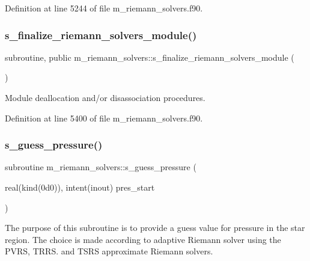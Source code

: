 Definition at line 5244 of file m\+\_\+riemann\+\_\+solvers.\+f90.

\mbox{\label{namespacem__riemann__solvers_a5bd1ce6fbbb840b5b1c6dd97ccb8d674}} 
\subsubsection{\texorpdfstring{s\+\_\+finalize\+\_\+riemann\+\_\+solvers\+\_\+module()}{s\_finalize\_riemann\_solvers\_module()}}
{\footnotesize\ttfamily subroutine, public m\+\_\+riemann\+\_\+solvers\+::s\+\_\+finalize\+\_\+riemann\+\_\+solvers\+\_\+module (\begin{DoxyParamCaption}{ }\end{DoxyParamCaption})}



Module deallocation and/or disassociation procedures. 



Definition at line 5400 of file m\+\_\+riemann\+\_\+solvers.\+f90.

\mbox{\label{namespacem__riemann__solvers_a7e533d9eadb12af316d72f1b722735d8}} 
\subsubsection{\texorpdfstring{s\+\_\+guess\+\_\+pressure()}{s\_guess\_pressure()}}
{\footnotesize\ttfamily subroutine m\+\_\+riemann\+\_\+solvers\+::s\+\_\+guess\+\_\+pressure (\begin{DoxyParamCaption}\item[{real(kind(0d0)), intent(inout)}]{pres\+\_\+start }\end{DoxyParamCaption})}



The purpose of this subroutine is to provide a guess value for pressure in the star region. The choice is made according to adaptive Riemann solver using the P\+V\+RS, T\+R\+RS. and T\+S\+RS approximate Riemann solvers. 


